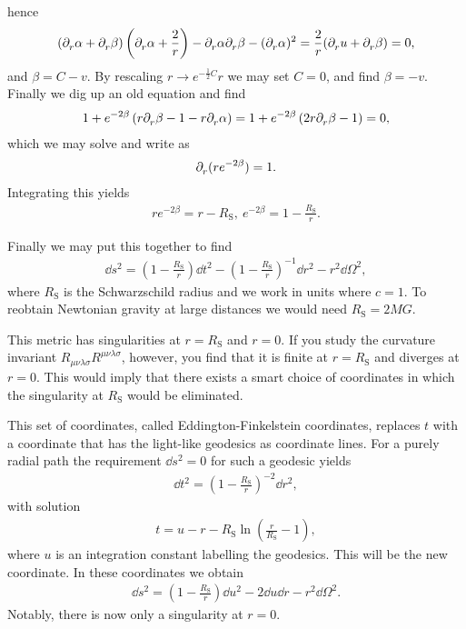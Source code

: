 hence
\begin{align*}
	(\partial^{}_{r}\alpha + \partial^{}_{r}\beta)\left(\partial^{}_{r}\alpha + \frac{2}{r}\right) - \partial^{}_{r}\alpha\partial^{}_{r}\beta - (\partial^{}_{r}\alpha)^{2} = \frac{2}{r}(\partial^{}_{r}u + \partial^{}_{r}\beta) = 0,
\end{align*}
and $\beta = C - v$. By rescaling $r\to e^{-\frac{1}{2}C}r$ we may set $C = 0$, and find $\beta = -v$. Finally we dig up an old equation and find
\begin{align*}
	1 + e^{-2\beta}\left(r\partial^{}_{r}\beta - 1 - r\partial^{}_{r}\alpha\right) = 1 + e^{-2\beta}\left(2r\partial^{}_{r}\beta - 1\right) = 0,
\end{align*}
which we may solve and write as
\begin{align*}
	\partial^{}_{r}(re^{-2\beta}) = 1.
\end{align*}
Integrating this yields
\begin{align*}
	re^{-2\beta} = r - R_{\text{S}},\ e^{-2\beta} = 1 - \frac{R_{\text{S}}}{r}.
\end{align*}

Finally we may put this together to find
\begin{align*}
	\dd{s}^{2} = \left(1 - \frac{R_{\text{S}}}{r}\right)\dd{t}^{2} - \left(1 - \frac{R_{\text{S}}}{r}\right)^{-1}\dd{r}^{2} - r^{2}\dd{\Omega}^{2},
\end{align*}
where $R_{\text{S}}$ is the Schwarzschild radius and we work in units where $c = 1$. To reobtain Newtonian gravity at large distances we would need $R_{\text{S}} = 2MG$.

This metric has singularities at $r = R_{\text{S}}$ and $r = 0$. If you study the curvature invariant $R_{\mu\nu\lambda\sigma}R^{\mu\nu\lambda\sigma}$, however, you find that it is finite at $r = R_{\text{S}}$ and diverges at $r = 0$. This would imply that there exists a smart choice of coordinates in which the singularity at $R_{\text{S}}$ would be eliminated.

This set of coordinates, called Eddington-Finkelstein coordinates, replaces $t$ with a coordinate that has the light-like geodesics as coordinate lines. For a purely radial path the requirement $\dd{s}^{2} = 0$ for such a geodesic yields
\begin{align*}
	\dd{t}^{2} = \left(1 - \frac{R_{\text{S}}}{r}\right)^{-2}\dd{r}^{2},
\end{align*}
with solution
\begin{align*}
	t = u - r - R_{\text{S}}\ln(\frac{r}{R_{\text{S}}} - 1),
\end{align*}
where $u$ is an integration constant labelling the geodesics. This will be the new coordinate. In these coordinates we obtain
\begin{align*}
	\dd{s}^{2} = \left(1 - \frac{R_{\text{S}}}{r}\right)\dd{u}^{2} - 2\dd{u}\dd{r} - r^{2}\dd{\Omega}^{2}.
\end{align*}
Notably, there is now only a singularity at $r = 0$.

